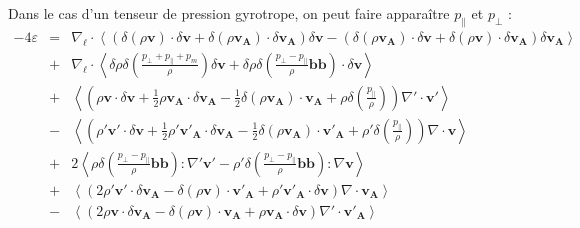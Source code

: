 Dans le cas d'un tenseur de pression gyrotrope, on peut faire apparaître $p_{\parallel}$ et $p_{\perp}$ : 
\begin{eqnarray}
\label{eq:turb_cpgyr_elk} 
- 4\varepsilon &=& \nabla_{\boldsymbol{\ell}} \cdot \left<\left(\delta \left(\rho\boldsymbol{v}\right) \cdot \delta \boldsymbol{v}+ \delta \left(\rho\boldsymbol{v_A}\right) \cdot \delta \boldsymbol{v_A} \right)\delta \boldsymbol{v}  -\left(\delta \left(\rho\boldsymbol{v_A}\right) \cdot \delta \boldsymbol{v}  + \delta \left(\rho\boldsymbol{v}\right) \cdot \delta \boldsymbol{v_A}  \right) \delta \boldsymbol{v_A} \right>\nonumber\\
&+& \nabla_{\boldsymbol{\ell}} \cdot \left< \delta \rho  \delta \left(\frac{p_{\perp} + p_{\parallel}+p_m}{\rho}\right) \delta \boldsymbol{v}+\delta \rho \delta \left(\frac{p_{\perp} - p_{\parallel}}{\rho}\boldsymbol{b}\boldsymbol{b}\right) \cdot \delta \boldsymbol{v} \right>\nonumber \\
& +&\left< \left(\rho \boldsymbol{v} \cdot \delta \boldsymbol{v} +\frac{1}{2} \rho \boldsymbol{v_A} \cdot  \delta \boldsymbol{v_A} -\frac{1}{2} \delta \left(\rho \boldsymbol{v_A}\right) \cdot \boldsymbol{v_A} +\rho \delta \left(\frac{p_{\parallel}}{\rho}\right)\right) \nabla' \cdot \boldsymbol{v'} \right>\nonumber\\
 & -&\left< \left(\rho' \boldsymbol{v'} \cdot \delta \boldsymbol{v}  + \frac{1}{2} \rho' \boldsymbol{v'_A} \cdot \delta \boldsymbol{v_A}  - \frac{1}{2} \delta \left(\rho \boldsymbol{v_A}\right) \cdot \boldsymbol{v'_A}  +\rho' \delta \left(\frac{p_{\parallel}}{\rho}\right)\right)\nabla \cdot \boldsymbol{v} \right>\nonumber\\
 &+&2\left<\rho \delta \left(\frac{p_{\perp} - p_{\parallel}}{\rho}\boldsymbol{b}\boldsymbol{b}\right):\nabla' \boldsymbol{v'} - \rho' \delta \left(\frac{p_{\perp} - p_{\parallel}}{\rho}\boldsymbol{b}\boldsymbol{b}\right) :\nabla  \boldsymbol{v}\right>\nonumber\\
&+& \left<\left(2 \rho' \boldsymbol{v'} \cdot \delta \boldsymbol{v_A}- \delta \left(\rho \boldsymbol{v}\right) \cdot \boldsymbol{v'_A} + \rho' \boldsymbol{v'_A} \cdot \delta \boldsymbol{v}  \right)\nabla \cdot \boldsymbol{v_A}\right>\nonumber\\
 &-& \left<\left(2\rho \boldsymbol{v} \cdot \delta \boldsymbol{v_A} - \delta \left(\rho \boldsymbol{v}\right) \cdot \boldsymbol{v_A} +  \rho \boldsymbol{v_A} \cdot \delta \boldsymbol{v} \right)\nabla' \cdot \boldsymbol{v'_A}\right> \nonumber\\

\end{eqnarray}
